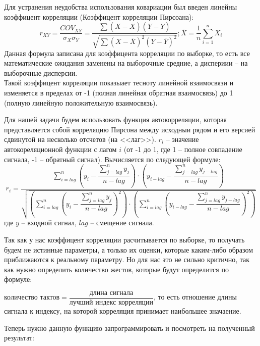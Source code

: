Для устранения неудобства использования ковариации был введен линейны коэффицент корреляции (Коэффицент корреляции Пирсоана):
\[r_{XY} = \dfrac{COV_{XY}}{\sigma_X \sigma_Y} = \dfrac{\sum (X - \overline{X}) (Y - \overline{Y})}{ \sqrt{\sum (X - \overline{X})^2 (Y - \overline{Y}) ^2} }; \overline{X} = \dfrac{1}{n} \sum_{i = 1}^n X_i\]
Данная формула записана для коэффицента корреляции по выборке, то есть все математические ожидания заменены на выборочные средние, а диспериии -- на выборочные дисперсии. \\
Такой коэффицент корреляции показыает тесноту линейной взаимосвязи и изменяется в пределах от -1 (полная линейная обратная взаимосвязь) до 1 (полную линейную положительную взаимосвязь).

Для нашей задачи будем использовать функция автокорреляции, которая представляется собой корреляцию Пирсона между исходныи рядом и его версией сдвинутой на несколько отсчетов (на <<лаг>>). $r_i$ -- значение автокореляционной функции с лагом $i$ (от -1 до 1, где 1 -- полное совпадение сигнала, -1 -- обратный сигнал). Вычисляется по следующей формуле:
\[r_i = \dfrac{\sum_{i = lag}^n \left(y_i - \dfrac{\sum_{j = lag}^n y_j}{n - lag} \right) \cdot \left(y_{i-lag} - \dfrac{\sum_{j = lag}^n y_{j - lag}}{n - lag} \right)}{\sqrt{ \left( \sum_{i = lag}^n \left(y_i - \dfrac{\sum_{j = lag}^n y_j}{n - lag} \right)^2 \right) \cdot \left( \sum_{i = lag}^n \left(y_{i - lag} - \dfrac{\sum_{j = lag}^n y_{j-lag}}{n - lag} \right)^2 \right) }}\]
где $y$ -- входной сигнал, $lag$ -- смещение сигнала.

Так как у нас коэффицент корреляции расчитывается по выборке, то получать будем не истинные параметры, а только их оценки, которые каким-либо образом приближаются к реальному параметру. Но для нас это не сильно критично, так как нужно определить количество жестов, которые будут определится по формуле:

$\text{количество тактов} = \dfrac{\text{длина сигнала}}{\text{лучший индекс корреляции}}$, то есть отношение длины сигнала к индексу, на которой корреляция принимает наибольшее значаение.

Теперь нужно данную функцию запрограммировать и посмотреть на полученный результат:

\begin{figure}[H]
\end{figure}

